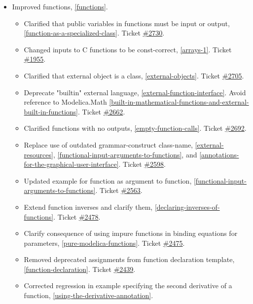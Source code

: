 \begin{itemize}
\item Improved functions, \cref{functions}.
\begin{itemize}
\item Clarified that public variables in functions must be input or output, \cref{function-as-a-specialized-class}.
Ticket \href{https://github.com/modelica/ModelicaSpecification/issues/2730}{\#2730}.
\item Changed inputs to C functions to be const-correct, \cref{arrays-1}.
Ticket \href{https://github.com/modelica/ModelicaSpecification/issues/1955}{\#1955}.
\item Clarified that external object is a class, \cref{external-objects}.
Ticket \href{https://github.com/modelica/ModelicaSpecification/issues/2705}{\#2705}.
\item Deprecate "builtin" external language, \cref{external-function-interface}.
Avoid reference to Modelica.Math \cref{built-in-mathematical-functions-and-external-built-in-functions}.
Ticket \href{https://github.com/modelica/ModelicaSpecification/issues/2662}{\#2662}.
\item Clarified functions with no outputs, \cref{empty-function-calls}.
Ticket \href{https://github.com/modelica/ModelicaSpecification/pull/2692}{\#2692}.
\item Replace use of outdated grammar-construct class-name, \cref{external-resources}, \cref{functional-input-arguments-to-functions}, and \cref{annotations-for-the-graphical-user-interface}.
Ticket \href{https://github.com/modelica/ModelicaSpecification/pull/2598}{\#2598}.
\item Updated example for function as argument to function, \cref{functional-input-arguments-to-functions}.
Ticket \href{https://github.com/modelica/ModelicaSpecification/issues/2563}{\#2563}.
\item Extend function inverses and clarify them, \cref{declaring-inverses-of-functions}.
Ticket \href{https://github.com/modelica/ModelicaSpecification/pull/2478}{\#2478}.
\item Clarify consequence of using impure functions in binding equations for parameters, \cref{pure-modelica-functions}.
Ticket \href{https://github.com/modelica/ModelicaSpecification/pull/2475}{\#2475}.
\item Removed deprecated assignments from function declaration template, \cref{function-declaration}.
Ticket \href{https://github.com/modelica/ModelicaSpecification/pull/2439}{\#2439}.
\item Corrected regression in example specifying the second derivative of a function, \cref{using-the-derivative-annotation}.

\end{itemize}
\end{itemize}
